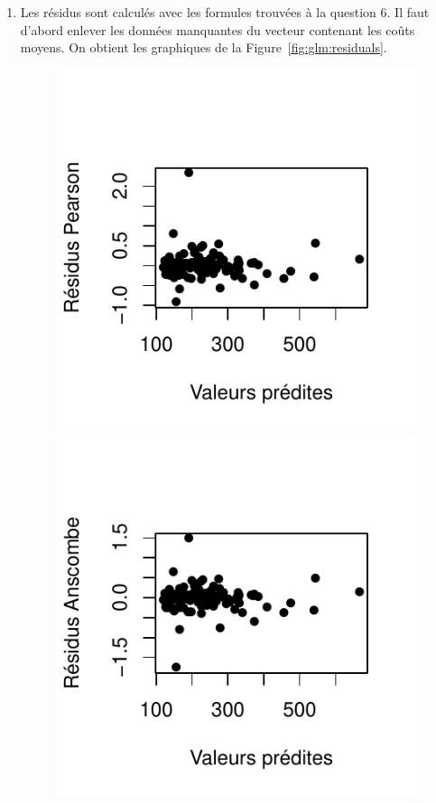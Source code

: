 \begin{solution}{5.8}
\begin{enumerate}
\item Les résidus sont calculés avec les formules trouvées à la question 6. Il faut d'abord enlever les données manquantes du vecteur contenant les coûts moyens. On obtient les graphiques de la Figure~\ref{fig:glm:residuals}.

\begin{figure}
\begin{center}
\begin{knitrout}
\color{fgcolor}
\includegraphics[width=\maxwidth]{figure/unnamed-chunk-75-1}

\includegraphics[width=\maxwidth]{figure/unnamed-chunk-75-2}


\end{knitrout}
\end{center}
\end{figure}
\end{enumerate}
\end{solution}
